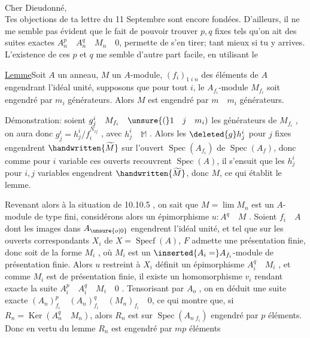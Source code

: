 \\

Cher Dieudonné,\\

Tes objections de ta lettre du 11 Septembre sont encore fondées. D'ailleurs, il ne me semble pas évident que le fait de pouvoir trouver $p,q$ fixes tels qu'on ait des suites exactes $A_n^p\quad A_n^q\quad M_n\quad0$, permette de s'en tirer; tant mieux si tu y arrives. L'existence de ces $p$ et $q$ me semble d'autre part facile, en utilisant le

\uline{Lemme}\quad Soit $A$ un anneau, $M$ un $A$-module, $(f_i)_{1\;i\;n}$ des éléments de $A$ engendrant l'idéal unité,  supposons que pour tout $i$, le $A_{f_i}$-module $M_{f_i}$ soit engendré par $m_i$ générateurs. Alors $M$ est engendré par $m\quad m_i$ générateurs.

Démonstration: soient $g_j^i\quad M_{f_i}\quad\unsure{(}1\quad j\quad m_i)$ les générateurs de $M_{f_i}$ , on aura donc $g_j^i=h_j^i/f_i^{N_{ij}}$ , avec $h_j^i\quad\mathbb{M}$ . Alors les $\deleted{g}h_j^i$ pour $j$ fixes engendrent $\handwritten{\widetilde{M}}$ sur l'ouvert $\operatorname{Spec}(A_{f_i})$ de $\operatorname{Spec}(A_f)$, donc comme pour $i$ variable ces ouverts recouvrent $\operatorname{Spec}(A)$, il s'ensuit que les $h_j^i$ pour $i,j$ variables engendrent $\handwritten{\widetilde{M}}$, donc $M$, ce qui établit le lemme.

Revenant alors à la situation de 10.10.5 , on sait que $M=\lim M_n$ est un $A$-module de type fini, considérons alors un épimorphisme $u:A^q\quad M$ . Soient $f_i\quad A$ dont les images dans $A_{\unsure{o|0}}$ engendrent l'idéal unité, et tel que sur les  ouverts correspondants $X_i$ de $X=\operatorname{Specf}(A)$, $F$ admette une présentation finie, donc soit de la forme $M_i$ , où $M_i$ est un $\inserted{A_i=}A_{f_i}$-module de présentation finie. Alors $u$ restreint à $X_i$ définit un épimorphisme $A_i^q\quad M_i$ , et comme $M_i$ est de présentation finie, il existe un homomorphisme $v_i$ rendant exacte la suite $A_i^p\quad A_i^q\quad M_i\quad0$ . Tensorisant par $A_o$ , on en déduit une suite exacte $(A_n)_{f_i}^p\quad(A_n)_{f_i}^q\quad(M_n)_{f_i}\quad0$, ce qui montre que, si $R_n=\operatorname{Ker}(A_n^q\quad M_n)$, alors $R_n$ est sur $\operatorname{Spec}(A_{n\;f_i})$ engendré par $p$ éléments. Donc en vertu du lemme $R_n$ est engendré par $mp$ éléments
